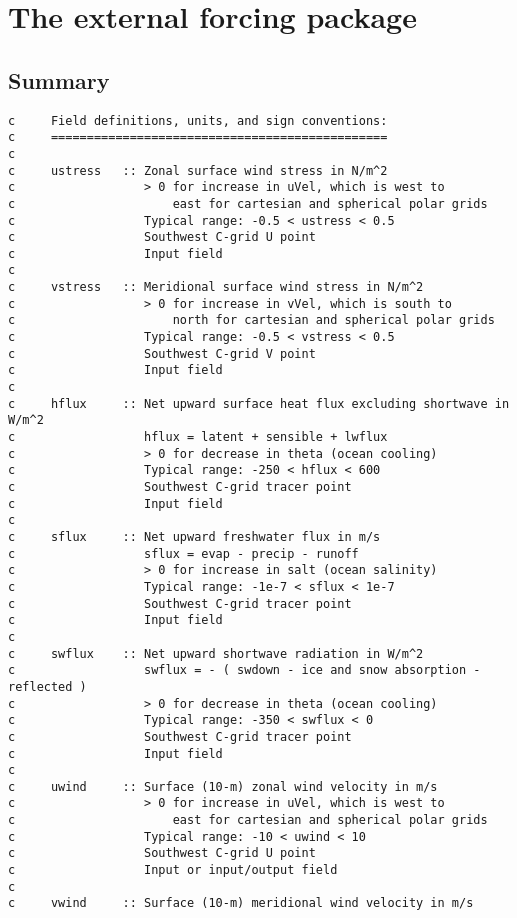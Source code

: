 \section{The external forcing package
\label{sectionexf}}

\subsection{Summary}

{\footnotesize
\begin{verbatim}
c     Field definitions, units, and sign conventions:
c     ===============================================
c
c     ustress   :: Zonal surface wind stress in N/m^2
c                  > 0 for increase in uVel, which is west to
c                      east for cartesian and spherical polar grids
c                  Typical range: -0.5 < ustress < 0.5
c                  Southwest C-grid U point
c                  Input field
c
c     vstress   :: Meridional surface wind stress in N/m^2
c                  > 0 for increase in vVel, which is south to
c                      north for cartesian and spherical polar grids
c                  Typical range: -0.5 < vstress < 0.5
c                  Southwest C-grid V point
c                  Input field
c
c     hflux     :: Net upward surface heat flux excluding shortwave in W/m^2
c                  hflux = latent + sensible + lwflux
c                  > 0 for decrease in theta (ocean cooling)
c                  Typical range: -250 < hflux < 600
c                  Southwest C-grid tracer point
c                  Input field
c
c     sflux     :: Net upward freshwater flux in m/s
c                  sflux = evap - precip - runoff
c                  > 0 for increase in salt (ocean salinity)
c                  Typical range: -1e-7 < sflux < 1e-7
c                  Southwest C-grid tracer point
c                  Input field
c
c     swflux    :: Net upward shortwave radiation in W/m^2
c                  swflux = - ( swdown - ice and snow absorption - reflected )
c                  > 0 for decrease in theta (ocean cooling)
c                  Typical range: -350 < swflux < 0
c                  Southwest C-grid tracer point
c                  Input field
c
c     uwind     :: Surface (10-m) zonal wind velocity in m/s
c                  > 0 for increase in uVel, which is west to
c                      east for cartesian and spherical polar grids
c                  Typical range: -10 < uwind < 10
c                  Southwest C-grid U point
c                  Input or input/output field
c
c     vwind     :: Surface (10-m) meridional wind velocity in m/s

\end{verbatim}}
